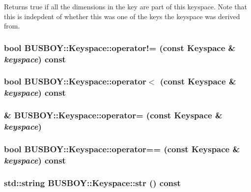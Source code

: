 Returns true if all the dimensions in the key are part of this keyspace. Note that this is indepdent of whether this was one of the keys the keyspace was derived from. \hypertarget{classBUSBOY_1_1Keyspace_a30fc123ce384d6ef6573e89598adb360}{
\subsubsection[{operator!=}]{\setlength{\rightskip}{0pt plus 5cm}bool BUSBOY::Keyspace::operator!= (const {\bf Keyspace} \& {\em keyspace}) const}}
\label{classBUSBOY_1_1Keyspace_a30fc123ce384d6ef6573e89598adb360}
\hypertarget{classBUSBOY_1_1Keyspace_ad1c49e682de775354b2d9e28e2833b1c}{
\subsubsection[{operator$<$}]{\setlength{\rightskip}{0pt plus 5cm}bool BUSBOY::Keyspace::operator$<$ (const {\bf Keyspace} \& {\em keyspace}) const}}
\label{classBUSBOY_1_1Keyspace_ad1c49e682de775354b2d9e28e2833b1c}
\hypertarget{classBUSBOY_1_1Keyspace_a2079515350d37073f129e62cf9a0dabf}{
\subsubsection[{operator=}]{ \& BUSBOY::Keyspace::operator= (const {\bf Keyspace} \& {\em keyspace})}}
\label{classBUSBOY_1_1Keyspace_a2079515350d37073f129e62cf9a0dabf}
\hypertarget{classBUSBOY_1_1Keyspace_aaf939c1fd29c7ffdb90010480bfc0c83}{
\subsubsection[{operator==}]{\setlength{\rightskip}{0pt plus 5cm}bool BUSBOY::Keyspace::operator== (const {\bf Keyspace} \& {\em keyspace}) const}}
\label{classBUSBOY_1_1Keyspace_aaf939c1fd29c7ffdb90010480bfc0c83}
\hypertarget{classBUSBOY_1_1Keyspace_a29cb418681c7d09801c6d833dd1ddae9}{
\subsubsection[{str}]{\setlength{\rightskip}{0pt plus 5cm}std::string BUSBOY::Keyspace::str () const}}
